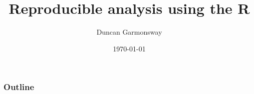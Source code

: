 \documentclass[t, handout]{beamer}
\title{Reproducible analysis using the R}
\subtitle{}
\author{Duncan Garmonsway}
\institute{Road Policing Support -- NZ Police}
\date{\today}
\begin{document}
\begin{frame}
\titlepage
\end{frame}

\begin{frame}
\frametitle{Outline}
\tableofcontents[hideallsubsections]
\end{frame}


\end{document}
